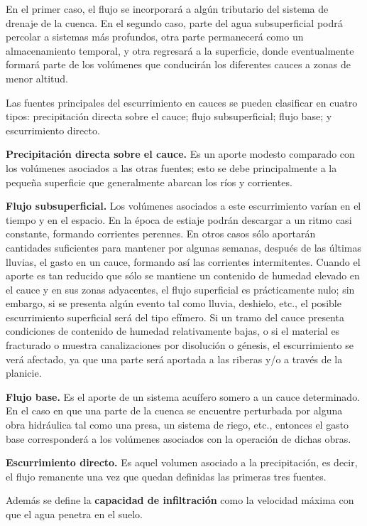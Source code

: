 \documentclass[10pt,a4paper, twoside]{report}
\begin{document}
En el primer caso, el flujo se incorporará a algún tributario del sistema de drenaje de la cuenca. En el segundo caso, parte del agua subsuperficial podrá percolar a sistemas más profundos, otra parte permanecerá como un almacenamiento temporal, y otra regresará a la superficie, donde eventualmente formará parte de los volúmenes que conducirán los diferentes cauces a zonas de menor altitud. 

Las fuentes principales del escurrimiento en cauces se pueden clasificar en cuatro tipos: precipitación directa sobre el cauce; flujo subsuperficial; flujo base; y escurrimiento directo.

\textbf{Precipitación directa sobre el cauce.}  Es un aporte modesto comparado con los volúmenes asociados a las otras fuentes; esto se debe principalmente a la pequeña superficie que generalmente abarcan los ríos y corrientes.

\textbf{Flujo subsuperficial.} Los volúmenes asociados a este escurrimiento varían en el tiempo y en el espacio. En la época de estiaje podrán descargar a un ritmo casi constante, formando corrientes perennes. En otros casos sólo aportarán cantidades suficientes para mantener por algunas semanas, después de las últimas lluvias, el gasto en un cauce, formando así las corrientes intermitentes. Cuando el aporte es tan reducido que sólo se mantiene un contenido de humedad elevado en el cauce y en sus zonas adyacentes, el flujo superficial es prácticamente nulo; sin embargo, si se presenta algún evento tal como lluvia, deshielo, etc., el posible escurrimiento superficial será del tipo efímero. 
Si un tramo del cauce presenta condiciones de contenido de humedad relativamente bajas, o si el material es fracturado o muestra canalizaciones por disolución o génesis, el escurrimiento se verá afectado, ya que una parte será aportada a las riberas y/o a través de la planicie. 

\textbf{Flujo base.} Es el aporte de un sistema acuífero somero a un cauce determinado. En el caso en que una parte de la cuenca se encuentre perturbada por alguna obra hidráulica tal como una presa, un sistema de 
riego, etc., entonces el gasto base corresponderá a los volúmenes asociados con la operación de dichas obras. 


\textbf{Escurrimiento directo.} Es aquel volumen asociado a la precipitación, es decir, el flujo remanente una vez que quedan definidas las primeras tres fuentes.

Además se define la \textbf{capacidad de infiltración} como la velocidad máxima con que el agua penetra en el suelo.
\end{document}
